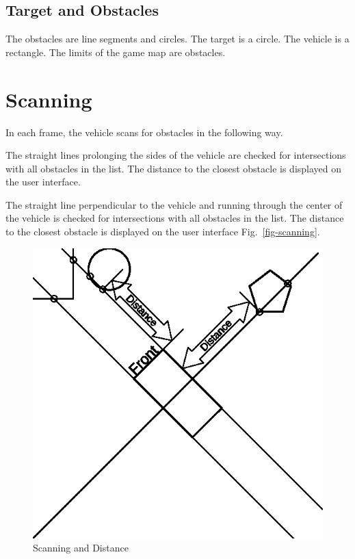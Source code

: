\documentclass[11pt]{article}
\newcommand{\figref}[1]{Fig.~\eqref{#1}}
\begin{document}
\subsection{Target and Obstacles}
\label{sec-obstacles}

The obstacles are line segments and circles. The target is a circle. The
vehicle is a rectangle. The limits of the game map are obstacles.

\pagebreak
\section{Scanning}
\label{sec-scanning}
In each frame, the vehicle scans for obstacles in the following way.

The straight lines prolonging the sides of the vehicle are checked for
intersections with all obstacles in the list. The distance to the closest 
obstacle is displayed on the user interface.

The straight line perpendicular to the vehicle and running through the center
of the vehicle is checked for intersections with all obstacles in the list.
The distance to the closest obstacle is displayed on the user interface
\figref{fig-scanning}.

\begin{figure}
    \centering
    \includegraphics{scanning.eps}
    \caption{Scanning and Distance}\label{fig-scanning}
\end{figure}
\end{document}
